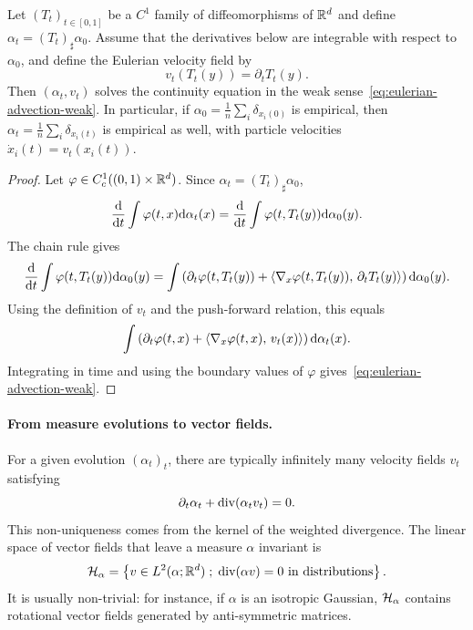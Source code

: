 \begin{prop}\label{prop-lagrangian-flow-continuity}
	Let $(T_t)_{t\in[0,1]}$ be a $C^1$ family of diffeomorphisms of $\mathbb{R}^d$ and define $\alpha_t=(T_t)_\sharp\alpha_0$. Assume that the derivatives below are integrable with respect to $\alpha_0$, and define the Eulerian velocity field by
	\[
		v_t(T_t(y))=\partial_t T_t(y).
	\]
	Then $(\alpha_t,v_t)$ solves the continuity equation in the weak sense~\eqref{eq:eulerian-advection-weak}.
	In particular, if $\alpha_0=\frac1n\sum_i\delta_{x_i(0)}$ is empirical, then $\alpha_t=\frac1n\sum_i\delta_{x_i(t)}$ is empirical as well, with particle velocities $\dot x_i(t)=v_t(x_i(t))$.
\end{prop}

\begin{proof}
	Let $\varphi\in C_c^1((0,1)\times\mathbb{R}^d)$. Since $\alpha_t=(T_t)_\sharp\alpha_0$,
	\[
		\frac{\mathrm{d}}{\mathrm{d} t}\int \varphi(t,x)\mathrm{d}\alpha_t(x)
		=
		\frac{\mathrm{d}}{\mathrm{d} t}\int \varphi(t,T_t(y))\mathrm{d}\alpha_0(y).
	\]
	The chain rule gives
	\[
		\frac{\mathrm{d}}{\mathrm{d} t}\int \varphi(t,T_t(y))\mathrm{d}\alpha_0(y)
		=
		\int
		\left(
			\partial_t\varphi(t,T_t(y))
			+\langle \nabla_x\varphi(t,T_t(y)),\,\partial_t T_t(y)\rangle
		\right)
		\mathrm{d}\alpha_0(y).
	\]
	Using the definition of $v_t$ and the push-forward relation, this equals
	\[
		\int
		\left(
			\partial_t\varphi(t,x)+\langle \nabla_x\varphi(t,x),\,v_t(x)\rangle
		\right)
		\mathrm{d}\alpha_t(x).
	\]
	Integrating in time and using the boundary values of $\varphi$ gives~\eqref{eq:eulerian-advection-weak}.
\end{proof}

\paragraph{From measure evolutions to vector fields.}

For a given evolution $(\alpha_t)_t$, there are typically infinitely many velocity fields $v_t$ satisfying
\begin{equation}\label{eq:inverse-flow}
	\partial_t\alpha_t+\operatorname{div}(\alpha_t v_t)=0.
\end{equation}
This non-uniqueness comes from the kernel of the weighted divergence. The linear space of vector fields that leave a measure $\alpha$ invariant is
\[
	\mathcal{H}_\alpha=\left\{ v\in L^2(\alpha;\mathbb{R}^d) \;;\; \operatorname{div}(\alpha v)=0\ \text{in distributions} \right\}.
\]
It is usually non-trivial: for instance, if $\alpha$ is an isotropic Gaussian, $\mathcal{H}_\alpha$ contains rotational vector fields generated by anti-symmetric matrices.

